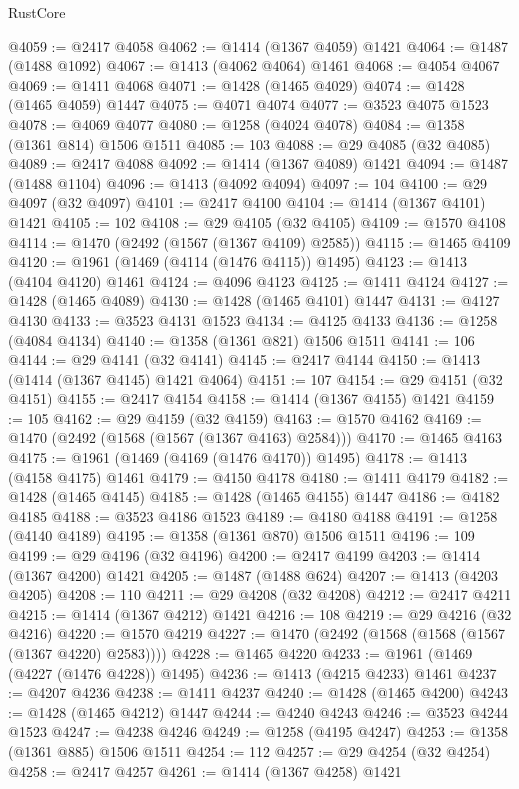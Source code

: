 \begin{lexlean}{RustCore}
\begin{coremodule}
@4059 := @2417 @4058
@4062 := @1414 (@1367 @4059) @1421
@4064 := @1487 (@1488 @1092)
@4067 := @1413 (@4062 @4064) @1461
@4068 := @4054 @4067
@4069 := @1411 @4068
@4071 := @1428 (@1465 @4029)
@4074 := @1428 (@1465 @4059) @1447
@4075 := @4071 @4074
@4077 := @3523 @4075 @1523
@4078 := @4069 @4077
@4080 := @1258 (@4024 @4078)
@4084 := @1358 (@1361 @814) @1506 @1511
@4085 := 103
@4088 := @29 @4085 (@32 @4085)
@4089 := @2417 @4088
@4092 := @1414 (@1367 @4089) @1421
@4094 := @1487 (@1488 @1104)
@4096 := @1413 (@4092 @4094)
@4097 := 104
@4100 := @29 @4097 (@32 @4097)
@4101 := @2417 @4100
@4104 := @1414 (@1367 @4101) @1421
@4105 := 102
@4108 := @29 @4105 (@32 @4105)
@4109 := @1570 @4108
@4114 := @1470 (@2492 (@1567 (@1367 @4109) @2585))
@4115 := @1465 @4109
@4120 := @1961 (@1469 (@4114 (@1476 @4115)) @1495)
@4123 := @1413 (@4104 @4120) @1461
@4124 := @4096 @4123
@4125 := @1411 @4124
@4127 := @1428 (@1465 @4089)
@4130 := @1428 (@1465 @4101) @1447
@4131 := @4127 @4130
@4133 := @3523 @4131 @1523
@4134 := @4125 @4133
@4136 := @1258 (@4084 @4134)
@4140 := @1358 (@1361 @821) @1506 @1511
@4141 := 106
@4144 := @29 @4141 (@32 @4141)
@4145 := @2417 @4144
@4150 := @1413 (@1414 (@1367 @4145) @1421 @4064)
@4151 := 107
@4154 := @29 @4151 (@32 @4151)
@4155 := @2417 @4154
@4158 := @1414 (@1367 @4155) @1421
@4159 := 105
@4162 := @29 @4159 (@32 @4159)
@4163 := @1570 @4162
@4169 := @1470 (@2492 (@1568 (@1567 (@1367 @4163) @2584)))
@4170 := @1465 @4163
@4175 := @1961 (@1469 (@4169 (@1476 @4170)) @1495)
@4178 := @1413 (@4158 @4175) @1461
@4179 := @4150 @4178
@4180 := @1411 @4179
@4182 := @1428 (@1465 @4145)
@4185 := @1428 (@1465 @4155) @1447
@4186 := @4182 @4185
@4188 := @3523 @4186 @1523
@4189 := @4180 @4188
@4191 := @1258 (@4140 @4189)
@4195 := @1358 (@1361 @870) @1506 @1511
@4196 := 109
@4199 := @29 @4196 (@32 @4196)
@4200 := @2417 @4199
@4203 := @1414 (@1367 @4200) @1421
@4205 := @1487 (@1488 @624)
@4207 := @1413 (@4203 @4205)
@4208 := 110
@4211 := @29 @4208 (@32 @4208)
@4212 := @2417 @4211
@4215 := @1414 (@1367 @4212) @1421
@4216 := 108
@4219 := @29 @4216 (@32 @4216)
@4220 := @1570 @4219
@4227 := @1470 (@2492 (@1568 (@1568 (@1567 (@1367 @4220) @2583))))
@4228 := @1465 @4220
@4233 := @1961 (@1469 (@4227 (@1476 @4228)) @1495)
@4236 := @1413 (@4215 @4233) @1461
@4237 := @4207 @4236
@4238 := @1411 @4237
@4240 := @1428 (@1465 @4200)
@4243 := @1428 (@1465 @4212) @1447
@4244 := @4240 @4243
@4246 := @3523 @4244 @1523
@4247 := @4238 @4246
@4249 := @1258 (@4195 @4247)
@4253 := @1358 (@1361 @885) @1506 @1511
@4254 := 112
@4257 := @29 @4254 (@32 @4254)
@4258 := @2417 @4257
@4261 := @1414 (@1367 @4258) @1421

\end{coremodule}
\end{lexlean}
